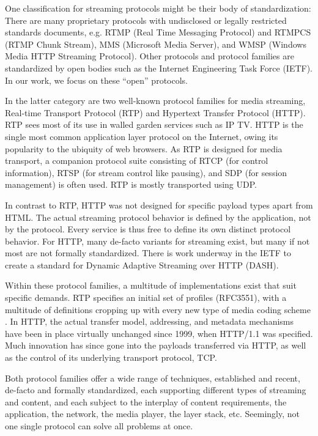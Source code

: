 One classification for streaming protocols might be their body of standardization: There are many proprietary protocols with undisclosed or legally restricted standards documents, e.g. RTMP (Real Time Messaging Protocol) and RTMPCS (RTMP Chunk Stream), MMS (Microsoft Media Server), and WMSP (Windows Media HTTP Streaming Protocol). Other protocols and protocol families are standardized by open bodies such as the Internet Engineering Task Force (IETF). In our work, we focus on these ``open'' protocols.

In the latter category are two well-known protocol families for media streaming, Real-time Transport Protocol (RTP) and Hypertext Transfer Protocol (HTTP). RTP sees most of its use in walled garden services such as IP TV. HTTP is the single most common application layer protocol on the Internet, owing its popularity to the ubiquity of web browsers. As RTP is designed for media transport, a companion protocol suite consisting of RTCP (for control information), RTSP (for stream control like pausing), and SDP (for session management) is often used. RTP is mostly transported using UDP.

In contrast to RTP, HTTP was not designed for specific payload types apart from HTML. The actual streaming protocol behavior is defined by the application, not by the protocol. Every service is thus free to define its own distinct protocol behavior. For HTTP, many de-facto variants for streaming exist, but many if not most are not formally standardized. There is work underway in the IETF to create a standard for Dynamic Adaptive Streaming over HTTP (DASH).



Within these protocol families, a multitude of implementations exist that suit specific demands. RTP specifies an initial set of profiles (RFC3551), with a multitude of definitions cropping up with every new type of media coding scheme . In HTTP, the actual transfer model, addressing, and metadata mechanisms have been in place virtually unchanged since 1999, when HTTP/1.1 was specified. Much innovation has since gone into the payloads transferred via HTTP, as well as the control of its underlying transport protocol, TCP.

Both protocol families offer a wide range of techniques, established and recent, de-facto and formally standardized, each supporting different types of streaming and content, and each subject to the interplay of content requirements, the application, the network, the media player, the layer stack, etc. Seemingly, not one single protocol can solve all problems at once. %


